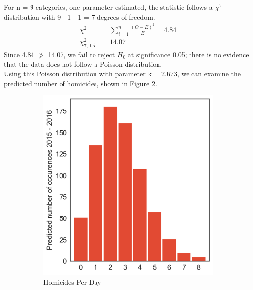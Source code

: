 \documentclass[12pt, titlepage]{article}
\begin{document}
\noindent For n = 9 categories, one parameter estimated, the statistic follows a $\chi^2$ distribution with 9 - 1 - 1 = 7 degrees of freedom.
\begin{equation}
\begin{split}
	\chi^2 & = \sum_{i = 1}^n \frac{(O - E)^2}{E} = 4.84 \\
	\chi^2_{7, .05} & = 14.07
\end{split}
\end{equation}
Since 4.84 $\ngtr$ 14.07, we fail to reject $H_0$ at significance 0.05; there is no evidence that the data does not follow a Poisson distribution.\\
Using this Poisson distribution with parameter k = 2.673, we can examine the predicted number of homicides, shown in Figure 2.
\begin{figure}[ht!]
    \centering
    \begin{subfigure}[t]{0.5\textwidth}
        \centering
        \includegraphics[width=.9\textwidth]{assets/day_frequency_poisson_(iiia).png}
        \caption{Homicides Per Day}
    \end{subfigure}%
    ~ 
    \begin{subfigure}[t]{0.5\textwidth}
        \centering

\end{subfigure}
\end{figure}
\end{document}
